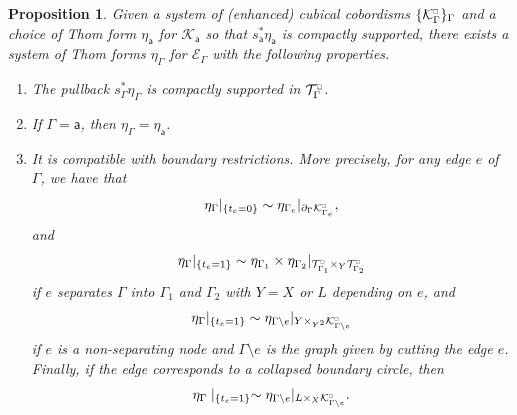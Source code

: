 \documentclass[11pt,psamsfonts, oneside, reqno]{amsart}
\newcommand{\sm}{\ensuremath{\setminus}}%
\newcommand{\del}{\partial}
\newcommand{\cE}{\mathcal{E}}
\newcommand{\cK}{\mathcal{K}}
\newcommand{\cT}{\mathcal{T}}
\newcommand{\obs}{s}
\newcommand{\cKc}{\cK^{\scale{\square}{0.6}}}
\newcommand{\scale}[2]{\scaleobj{#2}{#1}}
\newcommand{\cTc}{\cT^{\scale{\square}{0.6}}}
\newtheorem{proposition}[theorem]{Proposition}
\theoremstyle{definition}
\theoremstyle{remark}
\numberwithin{equation}{section}
\begin{document}
\begin{proposition}\label{prop:thom systems exist} Given a system of (enhanced) cubical cobordisms $\{\cKc_{\Gamma}\}_{\Gamma}$ and a choice of Thom form $\eta_{\mathsf{a}}$ for $\cK_{\mathsf{a}}$ so that $\obs_{\mathsf{a}}^*\eta_{\mathsf{a}}$ is compactly supported, there exists a system of Thom forms $\eta_{\Gamma}$ for $\cE_{\Gamma}$ with the following properties.
	\begin{enumerate}[label=\arabic*),leftmargin=20pt,ref=\arabic*]
		\item The pullback $\obs_{\Gamma}^*\eta_{\Gamma}$ is compactly supported in $\cTc_{\Gamma}$.
		\item If $\Gamma = \mathsf{a}$, then $\eta_{\Gamma} = \eta_{\mathsf{a}}$.
		\item It is compatible with boundary restrictions. More precisely, for any edge $e$ of $\Gamma$, we have that
		\begin{equation}
			\label{eq:thom-contracting-edge}
			\eta_\Gamma|_{\{t_e = 0\}} \sim \eta_{\Gamma_e}|_{\del_\Gamma\cKc_{\Gamma_e}}, 
		\end{equation} 
		and
		\begin{equation}
			\label{eq:thom-separating-edge}
			\eta_\Gamma|_{\{t_e = 1\}} \sim \eta_{\Gamma_1}\times \eta_{\Gamma_2}|_{\cTc_{\Gamma_1}\times_Y \cTc_{\Gamma_2}} 
		\end{equation}
		if $e $ separates $\Gamma$ into $\Gamma_1$ and $\Gamma_2$ with $Y = X$ or $L$ depending on $e$, and 
		\begin{equation}
			\label{eq:thom-nonseparating-edge}
			\eta_\Gamma|_{\{t_e = 1\}} \sim \eta_{\Gamma\sm e}|_{Y\times_{Y^2}\cKc_{\Gamma\sm e}} 
		\end{equation}
		if $e$ is a non-separating node and $\Gamma\sm e$ is the graph given by cutting the edge $e$. Finally, if the edge corresponds to a collapsed boundary circle, then
		\begin{equation}
			\label{eq:thom-boundary-edge-type-E}
			\eta_\Gamma\mid_{\{t_e = 1\}} \sim \eta_{\Gamma\sm e}|_{L\times_{X}\cKc_{\Gamma\sm e}}.
		\end{equation} 
	\end{enumerate}
\end{proposition}
\end{document}
